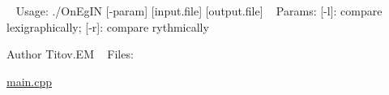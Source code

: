 ~\newline
Usage\+: ./\+On\+Eg\+IN \mbox{[}-\/param\mbox{]} \mbox{[}input.\+file\mbox{]} \mbox{[}output.\+file\mbox{]} ~\newline
Params\+: \mbox{[}-\/l\mbox{]}\+: compare lexigraphically; \mbox{[}-\/r\mbox{]}\+: compare rythmically ~\newline
\begin{DoxyAuthor}{Author}
Titov.\+EM ~\newline
Files\+: ~\newline

\begin{DoxyItemize}
\item \hyperlink{main_8cpp}{main.\+cpp} ~\newline
 
\end{DoxyItemize}
\end{DoxyAuthor}
